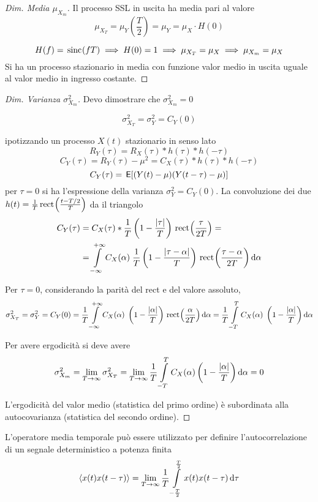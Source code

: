 \begin{proof}[Dim. Media $\mu_{X_m}$]
Il processo SSL in uscita ha media pari al valore
\[\mu_{X_T}=\mu_Y\left(\frac{T}{2}\right)=\mu_Y=\mu_X \cdot H(0)\]

\[H(f)=\,{\operatorname{sinc}}^{}\!\left({f T}\right)\implies H(0)=1\implies \mu_{X_T}=\mu_X \implies \mu_{X_m}=\mu_X \]
Si ha un processo stazionario in media con funzione valor medio in uscita uguale al valor medio in ingresso costante.
\end{proof}
\begin{proof}[Dim. Varianza $\sigma^2_{X_m}$]
Devo dimostrare che $\sigma^2_{X_m}=0$

\[\sigma^2_{X_T}=\sigma^2_{Y}=C_Y(0)\]

ipotizzando un processo $X(t)$ stazionario in senso lato
\[R_Y(\tau)=R_X(\tau)\ast h(\tau)\ast h(-\tau)\]
\[C_Y(\tau)=R_Y(\tau)-\mu^2=C_X(\tau)\ast h(\tau)\ast h(-\tau) \]
\[C_Y(\tau)=\,{\operatorname{\mathsf{E}}}\!\left[{(Y(t)-\mu)(Y(t-\tau)-\mu)}\right]\]
per $\tau=0$ si ha l'espressione della varianza $\sigma^2_Y=C_Y(0)$.
La convoluzione dei due $h(t)=\frac{1}{T}\,{\operatorname{rect}}^{}\!\left({\frac{t-T/2}{T}}\right)$ da il triangolo
\[\begin{split}
C_Y(\tau)&=C_X(\tau)\ast \frac{1}{T}\left(1-\frac{\left|{\tau}\right|}{T}\right)\,{\operatorname{rect}}^{}\!\left({\frac{\tau}{2 T}}\right)=\\
&=\int\limits_{-\infty}^{+\infty}{C_X(\alpha)\; \frac{1}{T}\left(1-\frac{\left|{\tau-\alpha}\right|}{T}\right)\,{\operatorname{rect}}^{}\!\left({\frac{\tau-\alpha}{2 T}}\right)}{\,\mathop{}\!\mathrm{d}{\alpha}}\end{split}\]

Per $\tau=0$, considerando la parità del rect e del valore assoluto,
\[\sigma^2_{X_T}=\sigma^2_{Y}=C_Y(0)=\frac{1}{T}\int\limits_{-\infty}^{+\infty}{C_X(\alpha)\; \left(1-\frac{\left|{\alpha}\right|}{T}\right)\,{\operatorname{rect}}^{}\!\left({\frac{\alpha}{2 T}}\right)}{\,\mathop{}\!\mathrm{d}{\alpha}}=\frac{1}{T}\int\limits_{-T}^{T}{C_X(\alpha)\; \left(1-\frac{\left|{\alpha}\right|}{T}\right)}{\,\mathop{}\!\mathrm{d}{\alpha}}
\]

Per avere ergodicità si deve avere
\[\sigma^2_{X_m}=\lim\limits_{T\to\infty}\sigma^2_{X_T}=\lim\limits_{T\to\infty}\frac{1}{T}\int\limits_{-T}^{T}{C_X(\alpha)\left(1-\frac{\left|{\alpha}\right|}{T}\right)}{\,\mathop{}\!\mathrm{d}{\alpha}}=0\]

L'ergodicità del valor medio (statistica del primo ordine) è subordinata alla autocovarianza (statistica del secondo ordine).
\end{proof}

L'operatore media temporale può essere utilizzato per definire l'autocorrelazione di un segnale deterministico a potenza finita
\begin{equation}
\langle x(t)x(t-\tau)\rangle=\lim\limits_{T\to\infty}\frac{1}{T}\int\limits_{-\frac{T}{2}}^{\frac{T}{2}}{x(t) x(t-\tau)}{\,\mathop{}\!\mathrm{d}{\tau}}
\end{equation}

